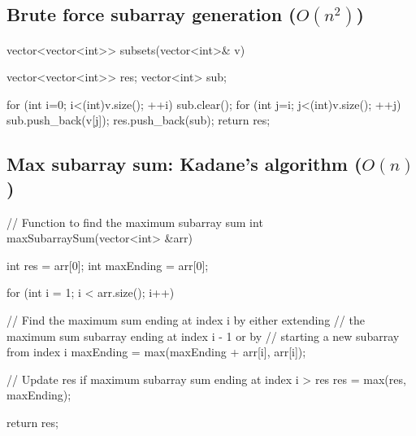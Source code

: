 \documentclass{report}
\begin{document}
\pagebreak 
{}
\bigbreak \noindent 
\subsection{Brute force subarray generation ($O(n^{2})$)}
\bigbreak \noindent 
\begin{cppcode}
    vector<vector<int>> subsets(vector<int>& v) {
        vector<vector<int>> res;
        vector<int> sub;

        for (int i=0; i<(int)v.size(); ++i) {
            sub.clear();
            for (int j=i; j<(int)v.size(); ++j) {
                sub.push_back(v[j]);
                res.push_back(sub);
            }
        }
        return res;
    }
\end{cppcode}
\bigbreak \noindent 
\subsection{Max subarray sum: Kadane's algorithm ($O(n)$)}
\bigbreak \noindent 
\begin{cppcode}
// Function to find the maximum subarray sum
int maxSubarraySum(vector<int> &arr) {
    int res = arr[0];
    int maxEnding = arr[0];

    for (int i = 1; i < arr.size(); i++) {
      
        // Find the maximum sum ending at index i by either extending 
        // the maximum sum subarray ending at index i - 1 or by
        // starting a new subarray from index i
        maxEnding = max(maxEnding + arr[i], arr[i]);
      
        // Update res if maximum subarray sum ending at index i > res
        res = max(res, maxEnding);
    }
    return res;
}
\end{cppcode}

\pagebreak 
{}
\bigbreak \noindent 


\pagebreak 
{}
\bigbreak \noindent 
\end{document}
